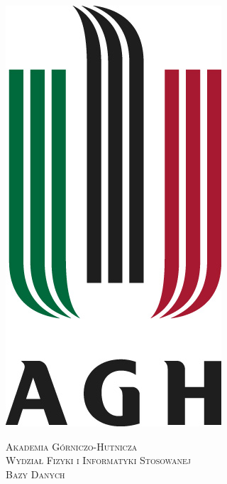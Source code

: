 \documentclass[a4paper,10pt,table]{article}
\begin{document}

\begin{titlepage}

\newcommand{\HRule}{\rule{\linewidth}{0.5mm}} %

\center %
 

\begin{center}\includegraphics[scale=0.6]{agh}\end{center}
\vspace*{10mm}
\textsc{\LARGE Akademia Górniczo-Hutnicza}\\[1.5cm] %
\textsc{\Large Wydział Fizyki i Informatyki Stosowanej}\\[0.5cm] %
\textsc{\large Bazy Danych}\\[0.5cm] %


\end{titlepage}
\end{document}
